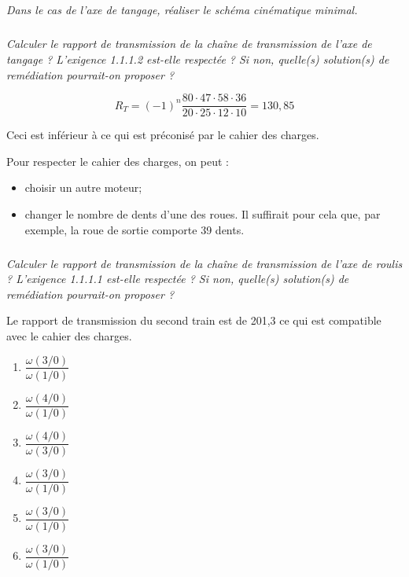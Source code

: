 \documentclass[10pt,fleqn]{article} %
\begin{document}
\begin{multicols}{2}
\subparagraph{}
\textit{Dans le cas de l'axe de tangage, réaliser le schéma cinématique minimal.}
\ifprof
\begin{corrige}
\end{corrige}
\else
\fi

\subparagraph{}
\textit{Calculer le rapport de transmission de la chaîne de transmission de l'axe de tangage ? L'exigence 1.1.1.2 est-elle respectée ? Si non, quelle(s) solution(s) de remédiation pourrait-on proposer ?}
\ifprof
\begin{corrige}
$$
R_T = (-1)^n \dfrac{80\cdot 47 \cdot 58 \cdot 36}{20\cdot 25\cdot 12 \cdot 10 } = 130,85
$$

Ceci est inférieur à ce qui est préconisé par le cahier des charges. 

Pour respecter le cahier des charges, on peut :
\begin{itemize}
\item choisir un autre moteur;
\item changer le nombre de dents d'une des roues. Il suffirait pour cela que,  par exemple, la roue de sortie comporte 39 dents. 
\end{itemize}
\end{corrige}
\else
\fi

\subparagraph{}
\textit{Calculer le rapport de transmission de la chaîne de transmission de l'axe de roulis ? L'exigence 1.1.1.1 est-elle respectée ? Si non, quelle(s) solution(s) de remédiation pourrait-on proposer ?}
\ifprof
\begin{corrige}
Le rapport de transmission du second train est de 201,3 ce qui est compatible avec le cahier des charges.
\end{corrige}
\else
\fi



\begin{enumerate}
\item $\dfrac{\omega(3/0)}{\omega(1/0)}$
\item $\dfrac{\omega(4/0)}{\omega(1/0)}$
\item $\dfrac{\omega(4/0)}{\omega(3/0)}$
\item $\dfrac{\omega(3/0)}{\omega(1/0)}$
\item $\dfrac{\omega(3/0)}{\omega(1/0)}$
\item $\dfrac{\omega(3/0)}{\omega(1/0)}$
\end{enumerate}




\end{multicols}
\end{document}

